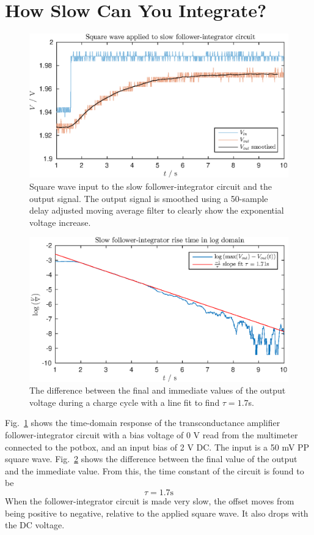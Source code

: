 \section{How Slow Can You Integrate?}
\begin{figure}
    \center
    \includegraphics{ex5-step.eps}
    \caption{Square wave input to the slow follower-integrator circuit and the output signal. The output signal is smoothed using a 50-sample delay adjusted moving
    average filter to clearly show the exponential voltage increase.}
    \label{fig:ex5-1}
\end{figure}
\begin{figure}
    \center
    \includegraphics{ex5-log.eps}
    \caption{The difference between the final and immediate values of the output voltage during a charge cycle with a line fit to find \(\tau = 1.7\)s.}
    \label{fig:ex5-2}
\end{figure}
Fig.~\ref{fig:ex5-1} shows the time-domain response of the transconductance amplifier follower-integrator circuit with a bias voltage of 0 V read from the multimeter
connected to the potbox, and an input bias of 2 V DC. The input is a 50 mV PP square wave. Fig.~\ref{fig:ex5-2} shows the difference between the final value of the
output and the immediate value. From this, the time constant of the circuit is found to be
\begin{equation*}
    \tau = 1.7 \mathrm{s}
\end{equation*}
When the follower-integrator circuit is made very slow, the offset moves from being positive to negative, relative to the applied square wave. It also
drops with the DC voltage.

